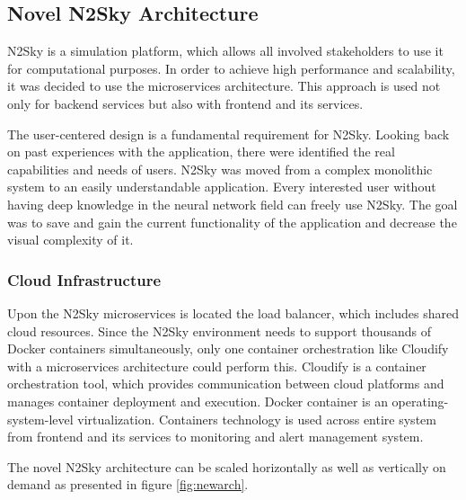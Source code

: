 \subsection{Novel N2Sky Architecture}\label{Contemporary N2Sky Architecture}

N2Sky is a simulation platform, which allows all involved stakeholders to use it for computational purposes. In order to achieve high performance and scalability, it was decided to use the microservices architecture. This approach is used not only for backend services but also with frontend and its services.

The user-centered design is a fundamental requirement for N2Sky. Looking back on past experiences with the application, there were identified the real capabilities and needs of users. N2Sky was moved from a complex monolithic system to an easily understandable application. Every interested user without having deep knowledge in the neural network field can freely use N2Sky.  The goal was to save and gain the current functionality of the application and decrease the visual complexity of it. 

\subsubsection{Cloud Infrastructure}\label{Cloud infrastructure}


Upon the N2Sky microservices is located the load balancer, which includes shared cloud resources. Since the N2Sky environment needs to support thousands of Docker containers \cite{docker} simultaneously, only one container orchestration like Cloudify \cite{cloudify} with a microservices architecture could perform this.  Cloudify is a container orchestration tool, which provides communication between cloud platforms and manages container deployment and execution. Docker container is an operating-system-level virtualization. Containers technology is used across entire system from frontend and its services to monitoring and alert management system. 

The novel N2Sky architecture can be scaled horizontally as well as vertically on demand as presented in figure \ref{fig:newarch}.

